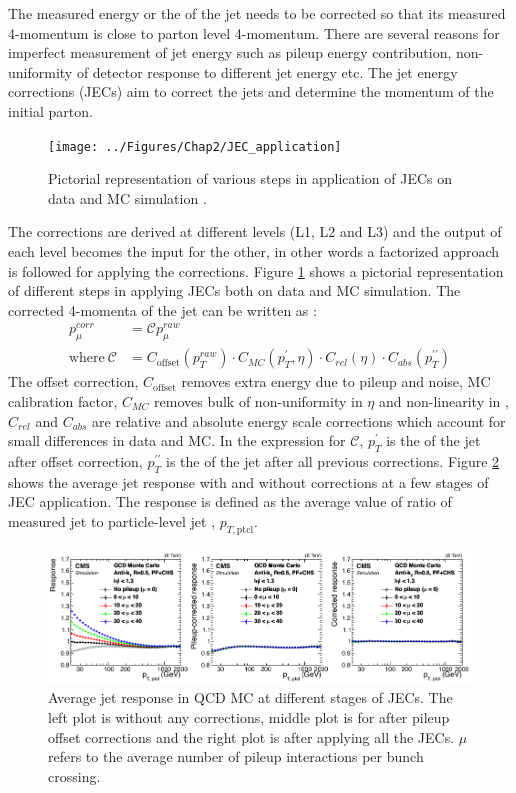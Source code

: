 The measured energy or the \pt of the jet needs to be corrected so that its measured 4-momentum is close to parton level 4-momentum. There 
are several reasons for imperfect measurement of jet energy such as pileup energy contribution, non-uniformity of detector response to 
different jet energy etc. The jet energy corrections (JECs) aim to correct the jets and determine the momentum of the initial parton.
\begin{figure}[h!]
\centering
\texttt{[image: ../Figures/Chap2/JEC\_application]}
\captionsetup{width=.95\linewidth}
\caption[Application of JEC]{Pictorial representation of various steps in application of JECs on data and MC simulation \cite{Khachatryan:2016kdb}.}
\label{fig:JEC_application}
\end{figure}
The corrections are derived at different levels (L1, L2 and L3) and the output of each level becomes the input for the other, in other 
words a factorized approach is followed for applying the corrections. Figure \ref{fig:JEC_application} shows a pictorial representation of 
different steps in applying JECs both on data and MC simulation. The corrected 4-momenta of the jet can be written as 
\cite{Chatrchyan:2011ds}:
\begin{align}
p_{\mu}^{corr} &= \mathcal{C}p_{\mu}^{raw}\\
\mathrm{where\ }\mathcal{C} &=C_{\mathrm{offset}}(p_{T}^{raw})\cdot C_{MC}(p_{T}^{\prime},\eta) \cdot C_{rel}(\eta) \cdot C_{abs}(p_{T}^{\prime\prime})
\end{align}
The offset correction, $C_{\mathrm{offset}}$ removes extra energy due to pileup and noise, MC calibration factor, $C_{MC}$ removes bulk of 
non-uniformity in $\eta$ and non-linearity in \pt, $C_{rel}$ and $C_{abs}$ are relative and absolute energy scale corrections which 
account for small differences in data and MC. In the expression for $\mathcal{C}$, $p_{T}^{\prime}$ is the \pt of the jet after offset 
correction, $p_{T}^{\prime\prime}$ is the \pt of the jet after all previous corrections. Figure \ref{fig:JetResp_JECs} shows the average 
jet \pt response with and without corrections at a few stages of JEC application. The \pt response is defined as the average value of 
ratio of measured jet \pt to particle-level jet \pt, $p_{T,\mathrm{ptcl}}$.
\begin{figure}[h!]
\centering
\includegraphics[width=0.95\linewidth]{../Figures/Chap2/JetResp_JECs}
\captionsetup{width=.98\linewidth}
\caption[Jet \pt response with and w/o corrections]{Average jet \pt response in QCD MC at different stages of JECs. The left plot is 
without any corrections, middle plot is for after pileup offset corrections and the right plot is after applying all the JECs. $\mu$ 
refers to the average number of pileup interactions per bunch crossing.}
\label{fig:JetResp_JECs}
\end{figure}

